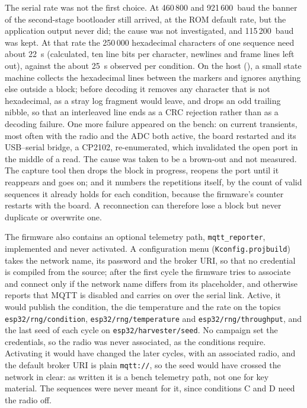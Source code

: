 The serial rate was not the first choice. At 460\,800 and 921\,600~baud
the banner of the second-stage bootloader still arrived, at the ROM
default rate, but the application output never did; the cause was not
investigated, and 115\,200~baud was kept. At that rate the 250\,000
hexadecimal characters of one sequence need about 22~s (calculated, ten
line bits per character, newlines and frame lines left out), against the
about 25~s observed per condition. On the host
(), a small state machine collects
the hexadecimal lines between the markers and ignores anything else
outside a block; before decoding it removes any character that is not
hexadecimal, as a stray log fragment would leave, and drops an odd
trailing nibble, so that an interleaved line ends as a CRC rejection
rather than as a decoding failure. One more failure appeared on the
bench: on current transients, most often with the radio and the ADC both
active, the board restarted and its USB--serial bridge, a CP2102,
re-enumerated, which invalidated the open port in the middle of a read.
The cause was taken to be a brown-out and not measured. The capture tool
then drops the block in progress, reopens the port until it reappears
and goes on; and it numbers the repetitions itself, by the count of valid
sequences it already holds for each condition, because the firmware's
counter restarts with the board. A reconnection can therefore lose a
block but never duplicate or overwrite one.

The firmware also contains an optional telemetry path,
\texttt{mqtt\_reporter}, implemented and never activated. A configuration
menu (\texttt{Kconfig.projbuild}) takes the network name, its password and
the broker URI, so that no credential is compiled from the source; after
the first cycle the firmware tries to associate and connect only if the
network name differs from its placeholder, and otherwise reports that
MQTT is disabled and carries on over the serial link. Active, it would
publish the condition, the die temperature and the rate on the topics
\texttt{esp32/rng/condition}, \texttt{esp32/rng/temperature} and
\texttt{esp32/rng/throughput}, and the last seed of each cycle on
\texttt{esp32/harvester/seed}. No campaign set the credentials, so the
radio was never associated, as the conditions require. Activating it
would have changed the later cycles, with an associated radio, and the
default broker URI is plain \texttt{mqtt://}, so the seed would have
crossed the network in clear: as written it is a bench telemetry path,
not one for key material. The sequences were never meant for it, since
conditions C and D need the radio off.

